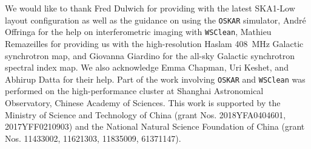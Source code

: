 \documentclass[modern]{aastex62}
\begin{document}
\acknowledgments

We would like to thank
Fred Dulwich for providing with the latest SKA1-Low layout configuration
as well as the guidance on using the \texttt{OSKAR} simulator,
Andr\'e Offringa for the help on interferometric imaging with
\texttt{WSClean},
Mathieu Remazeilles for providing us with the high-resolution Haslam
\SI{408}{\MHz} Galactic synchrotron map,
and Giovanna Giardino for the all-sky Galactic synchrotron spectral
index map.
We also acknowledge Emma Chapman, Uri Keshet, and Abhirup Datta for
their help.
Part of the work involving \texttt{OSKAR} and \texttt{WSClean} was
performed on the high-performance cluster at Shanghai Astronomical
Observatory, Chinese Academy of Sciences.
This work is supported by
the Ministry of Science and Technology of China
(grant Nos. 2018YFA0404601, 2017YFF0210903)
and the National Natural Science Foundation of China
(grant Nos. 11433002, 11621303, 11835009, 61371147).


%

\vspace{5mm}




\appendix
\end{document}
